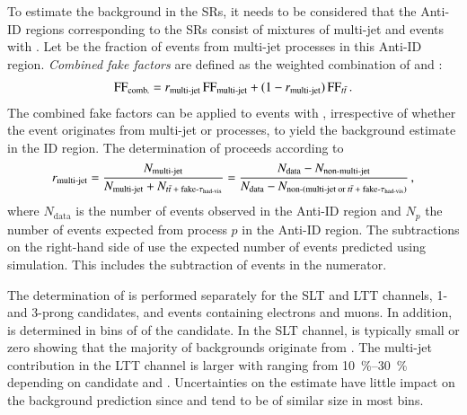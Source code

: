 To estimate the \faketauhadvis background in the SRs, it needs to be
considered that the Anti-ID regions corresponding to the SRs consist
of mixtures of multi-jet and \ttbar events with \faketauhadvis. Let
\rqcd be the fraction of \faketauhadvis events from multi-jet
processes in this Anti-ID region. \emph{Combined fake factors} are
defined as the weighted combination of \FFqcd and \FFttbar:
\begin{align*}
  \text{FF}_{\text{comb.}} = r_{\text{multi-jet}} \, \text{FF}_{\text{multi-jet}} + (1 - r_{\text{multi-jet}}) \, \text{FF}_{t\bar{t}} \,\text{.}
\end{align*}
The combined fake factors can be applied to events with
\faketauhadvis, irrespective of whether the event originates from
multi-jet or \ttbar processes, to yield the background estimate in the
ID region. The determination of \rqcd proceeds according to
\begin{align}
  \rqcd =
  \frac{N_{\text{multi-jet}}}{N_{\text{multi-jet}} + N_{\text{\ttbarFakes}}}
  = \frac
  { N_{\text{data}} - N_{\text{non-multi-jet}} }
  { N_{\text{data}} - N_{\text{non-(multi-jet or \ttbarFakes)}} } \,\text{,}
  \label{eq:rqcd}
\end{align}
where $N_{\text{data}}$ is the number of events observed in the
Anti-ID region and $N_{p}$ the number of events expected from process
$p$ in the Anti-ID region. The subtractions on the right-hand side of
 use the expected number of events predicted using
simulation. This includes the subtraction of \ttbarFakes events in the
numerator.

The determination of \rqcd is performed separately for the \lephad SLT
and LTT channels, 1- and 3-prong \tauhadvis candidates, and events
containing electrons and muons. In addition, \rqcd is determined in
bins of \pT of the \tauhadvis candidate. In the SLT channel, \rqcd is
typically small or zero showing that the majority of \faketauhadvis
backgrounds originate from \ttbar. The multi-jet contribution in the
LTT channel is larger with \rqcd ranging from
\SIrange{10}{30}{\percent} depending on \tauhadvis candidate \pT and
\Ntracks. Uncertainties on the \rqcd estimate have little impact on
the \faketauhadvis background prediction since \FFqcd and \FFttbar
tend to be of similar size in most bins.


